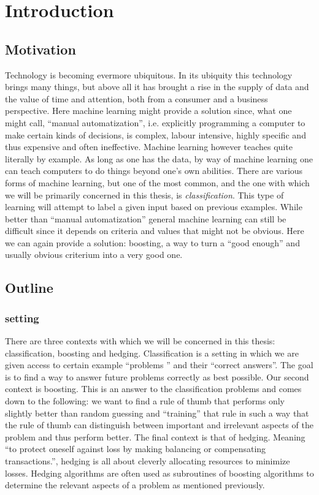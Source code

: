 
\chapter{Introduction}
\label{chap:intro}
\section{Motivation}
\label{sec:motiv}

Technology is becoming evermore ubiquitous. In its ubiquity this technology brings many things, but above all it has brought a rise in the supply of data and the value of time and attention, both from a consumer and a business perspective. Here machine learning might provide a solution since, what one might call, ``manual automatization'', i.e. explicitly programming a computer to make certain kinds of decisions, is complex, labour intensive, highly specific and thus expensive and often ineffective. Machine learning however teaches quite literally by example. As long as one has the data, by way of machine learning one can teach computers to do things beyond one's own abilities. There are various forms of machine learning, but one of the most common, and the one with which we will be primarily concerned in this thesis, is \textit{classification}. This type of learning will attempt to label a given input based on previous examples. While better than ``manual automatization'' general machine learning can still be difficult since it depends on criteria and values that might not be obvious. Here we can again provide a solution: boosting, a way to turn a ``good enough'' and usually obvious criterium into a very good one.

\section{Outline}
\subsection{setting}
There are three contexts with which we will be concerned in this thesis: classification, boosting and hedging.
Classification is a setting in which we are given access to certain example ``problems '' and their ``correct answers''. The goal is to find a way to answer future problems correctly as best possible. Our second context is boosting. This is an answer to the classification problems and comes down to the following: we want to find a rule of thumb that performs only slightly better than random guessing and ``training''  that rule in such a way that the rule of thumb  can distinguish between important and irrelevant aspects of the problem and thus perform better. The final context is that of hedging. Meaning ``to protect oneself against loss by making balancing or compensating transactions.'', hedging is all about cleverly allocating resources to minimize losses. Hedging algorithms are often used as subroutines of boosting algorithms to determine the relevant aspects of a problem as mentioned previously. 
\newpage
